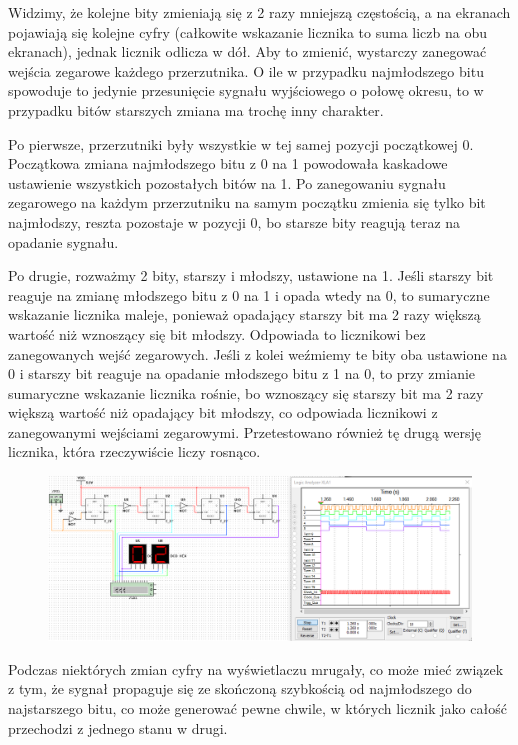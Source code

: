 \documentclass[12pt,a4paper]{article}
\begin{document}
Widzimy, że kolejne bity zmieniają się z 2 razy mniejszą częstością, a na ekranach pojawiają się kolejne cyfry (całkowite wskazanie licznika to suma liczb na obu ekranach), jednak licznik odlicza w dół. Aby to zmienić, wystarczy zanegować wejścia zegarowe każdego przerzutnika. O ile w przypadku najmłodszego bitu spowoduje to jedynie przesunięcie sygnału wyjściowego o połowę okresu, to w przypadku bitów starszych zmiana ma trochę inny charakter.

Po pierwsze, przerzutniki były wszystkie w tej samej pozycji początkowej 0. Początkowa zmiana najmłodszego bitu z 0 na 1 powodowała kaskadowe ustawienie wszystkich pozostałych bitów na 1. Po zanegowaniu sygnału zegarowego na każdym przerzutniku na samym początku zmienia się tylko bit najmłodszy, reszta pozostaje w pozycji 0, bo starsze bity reagują teraz na opadanie sygnału.

Po drugie, rozważmy 2 bity, starszy i młodszy, ustawione na 1. Jeśli starszy bit reaguje na zmianę młodszego bitu z 0 na 1 i opada wtedy na 0, to sumaryczne wskazanie licznika maleje, ponieważ opadający starszy bit ma 2 razy większą wartość niż wznoszący się bit młodszy. Odpowiada to licznikowi bez zanegowanych wejść zegarowych. Jeśli z kolei weźmiemy te bity oba ustawione na 0 i starszy bit reaguje na opadanie młodszego bitu z 1 na 0, to przy zmianie sumaryczne wskazanie licznika rośnie, bo wznoszący się starszy bit ma 2 razy większą wartość niż opadający bit młodszy, co odpowiada licznikowi z zanegowanymi wejściami zegarowymi. Przetestowano również tę drugą wersję licznika, która rzeczywiście liczy rosnąco.

\begin{figure}[H]
\centering
\includegraphics[width=\textwidth]{img/4b_circuit2}
\end{figure}

Podczas niektórych zmian cyfry na wyświetlaczu mrugały, co może mieć związek z tym, że sygnał propaguje się ze skończoną szybkością od najmłodszego do najstarszego bitu, co może generować pewne chwile, w których licznik jako całość przechodzi z jednego stanu w drugi.
\end{document}
